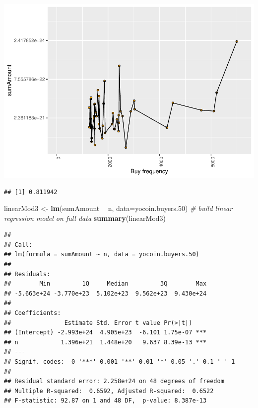 \documentclass[]{article}
\newenvironment{Shaded}{\begin{snugshade}}{\end{snugshade}}
\newcommand{\KeywordTok}[1]{\textcolor[rgb]{0.13,0.29,0.53}{\textbf{#1}}}
\newcommand{\DataTypeTok}[1]{\textcolor[rgb]{0.13,0.29,0.53}{#1}}
\newcommand{\DecValTok}[1]{\textcolor[rgb]{0.00,0.00,0.81}{#1}}
\newcommand{\StringTok}[1]{\textcolor[rgb]{0.31,0.60,0.02}{#1}}
\newcommand{\CommentTok}[1]{\textcolor[rgb]{0.56,0.35,0.01}{\textit{#1}}}
\newcommand{\OperatorTok}[1]{\textcolor[rgb]{0.81,0.36,0.00}{\textbf{#1}}}
\newcommand{\NormalTok}[1]{#1}
\begin{document}
\includegraphics{analysis_files/figure-latex/unnamed-chunk-77-1.pdf}

\begin{Shaded}
\end{Shaded}

\begin{verbatim}
## [1] 0.811942
\end{verbatim}

\begin{Shaded}
\begin{Highlighting}[]
\NormalTok{linearMod3 <-}\StringTok{ }\KeywordTok{lm}\NormalTok{(sumAmount }\OperatorTok{~}\StringTok{ }\NormalTok{n, }\DataTypeTok{data=}\NormalTok{yocoin.buyers.}\DecValTok{50}\NormalTok{)  }\CommentTok{# build linear regression model on full data}
\KeywordTok{summary}\NormalTok{(linearMod3)}
\end{Highlighting}
\end{Shaded}

\begin{verbatim}
## 
## Call:
## lm(formula = sumAmount ~ n, data = yocoin.buyers.50)
## 
## Residuals:
##        Min         1Q     Median         3Q        Max 
## -5.663e+24 -3.770e+23  5.102e+23  9.562e+23  9.430e+24 
## 
## Coefficients:
##               Estimate Std. Error t value Pr(>|t|)    
## (Intercept) -2.993e+24  4.905e+23  -6.101 1.75e-07 ***
## n            1.396e+21  1.448e+20   9.637 8.39e-13 ***
## ---
## Signif. codes:  0 '***' 0.001 '**' 0.01 '*' 0.05 '.' 0.1 ' ' 1
## 
## Residual standard error: 2.258e+24 on 48 degrees of freedom
## Multiple R-squared:  0.6592, Adjusted R-squared:  0.6522 
## F-statistic: 92.87 on 1 and 48 DF,  p-value: 8.387e-13
\end{verbatim}
\end{document}
